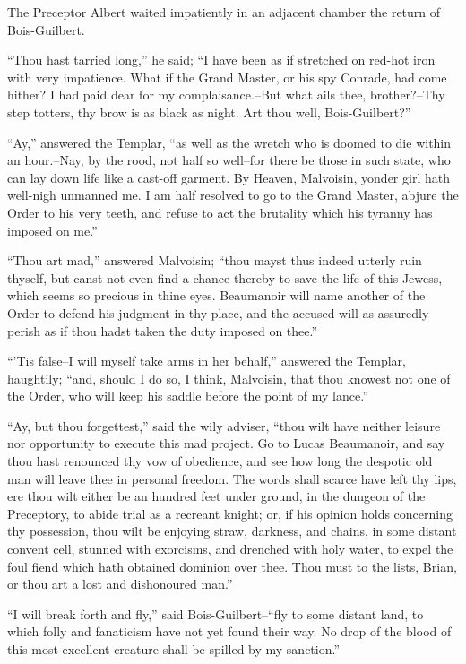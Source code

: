 The Preceptor Albert waited impatiently in an adjacent chamber the
return of Bois-Guilbert.

``Thou hast tarried long,'' he said; ``I have been as if stretched on
red-hot iron with very impatience. What if the Grand Master, or his spy
Conrade, had come hither? I had paid dear for my complaisance.--But what
ails thee, brother?--Thy step totters, thy brow is as black as night.
Art thou well, Bois-Guilbert?''

``Ay,'' answered the Templar, ``as well as the wretch who is doomed to
die within an hour.--Nay, by the rood, not half so well--for there be
those in such state, who can lay down life like a cast-off garment. By
Heaven, Malvoisin, yonder girl hath well-nigh unmanned me. I am half
resolved to go to the Grand Master, abjure the Order to his very teeth,
and refuse to act the brutality which his tyranny has imposed on me.''

``Thou art mad,'' answered Malvoisin; ``thou mayst thus indeed utterly
ruin thyself, but canst not even find a chance thereby to save the life
of this Jewess, which seems so precious in thine eyes. Beaumanoir will
name another of the Order to defend his judgment in thy place, and the
accused will as assuredly perish as if thou hadst taken the duty imposed
on thee.''

``'Tis false--I will myself take arms in her behalf,'' answered the
Templar, haughtily; ``and, should I do so, I think, Malvoisin, that thou
knowest not one of the Order, who will keep his saddle before the point
of my lance.''

``Ay, but thou forgettest,'' said the wily adviser, ``thou wilt have
neither leisure nor opportunity to execute this mad project. Go to Lucas
Beaumanoir, and say thou hast renounced thy vow of obedience, and see
how long the despotic old man will leave thee in personal freedom. The
words shall scarce have left thy lips, ere thou wilt either be an
hundred feet under ground, in the dungeon of the Preceptory, to abide
trial as a recreant knight; or, if his opinion holds concerning thy
possession, thou wilt be enjoying straw, darkness, and chains, in some
distant convent cell, stunned with exorcisms, and drenched with holy
water, to expel the foul fiend which hath obtained dominion over thee.
Thou must to the lists, Brian, or thou art a lost and dishonoured man.''

``I will break forth and fly,'' said Bois-Guilbert--``fly to some
distant land, to which folly and fanaticism have not yet found their
way. No drop of the blood of this most excellent creature shall be
spilled by my sanction.''

